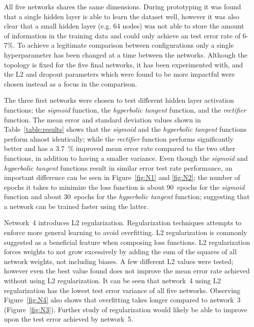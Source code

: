 All five networks shares the same dimensions. During prototyping it was found that a single hidden layer is able to learn the dataset well, however it was also clear that a small hidden layer (e.g. 64 nodes) was not able to store the amount of information in the training data and could only achieve an test error rate of 6-7\%. To achieve a legitimate comparison between configurations only a single hyperparameter has been changed at a time between the networks. Although the topology is fixed for the five final networks, it has been experimented with, and the \textsc{L2} and dropout parameters which were found to be more impactful were chosen instead as a focus in the comparison.


The three first networks were chosen to test different hidden layer activation functions; the \textit{sigmoid} function, the \textit{hyperbolic tangent} function, and the \textit{rectifier} function. The mean error and standard deviation values shown in Table~\ref{table:results} shows that the \textit{sigmoid} and the \textit{hyperbolic tangent} functions perform almost identically; while the \textit{rectifier} function performs significantly better and has a 3.7~\% improved mean error rate compared to the two other functions, in addition to having a smaller variance. Even though the \textit{sigmoid} and \textit{hyperbolic tangent} functions result in similar error test rate performance, an important difference can be seen in Figure~\ref{fig:N1} and \ref{fig:N2}; the number of epochs it takes to minimize the loss function is about 90~epochs for the \textit{sigmoid} function and about 30~epochs for the \textit{hyperbolic tangent} function; suggesting that a network can be trained faster using the latter.


Network~4 introduces \textsc{L2} regularization. Regularization techniques attempts to enforce more general learning to avoid overfitting. \textsc{L2} regularization is commonly suggested as a beneficial feature when composing loss functions. \textsc{L2} regularization forces weights to not grow excessively by adding the sum of the squares of all network weights, not including biases. A few different \textsc{L2} values were tested; however even the best value found does not improve the mean error rate achieved without using \textsc{L2} regularization. It can be seen that network~4 using \textsc{L2} regularization has the lowest test error variance of all five networks. Observing Figure~\ref{fig:N4} also shows that overfitting takes longer compared to network~3 (Figure~\ref{fig:N3}). Further study of regularization would likely be able to improve upon the test error achieved by network~5.


